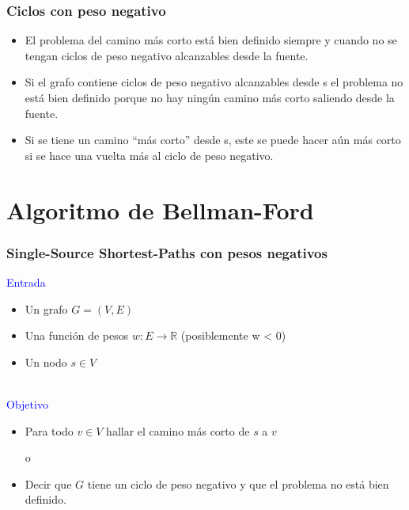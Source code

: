 \documentclass{beamer}
\begin{document}
	\begin{frame}
		\frametitle{Ciclos con peso negativo}
		\begin{itemize}
			\item El problema del camino más corto está bien definido siempre y cuando no se tengan ciclos de peso negativo alcanzables desde la fuente.
			\item Si el grafo contiene ciclos de peso negativo alcanzables desde s el problema no está bien definido porque no hay ningún camino más corto saliendo desde la fuente.
			\item Si se tiene un camino ``más corto'' desde s, este se puede hacer aún más corto si se hace una vuelta más al ciclo de peso negativo.
		\end{itemize}
	\end{frame}


\section{Algoritmo de Bellman-Ford}

	\begin{frame}
		\frametitle{Single-Source Shortest-Paths con pesos negativos}
		\textcolor{blue}{\large Entrada}\\
		\begin{itemize}
			\item Un grafo $G = (V, E)$
			\item Una función de pesos $w : E \rightarrow \mathbb{R}$ (posiblemente w < 0)
			\item Un nodo $s \in V$
		\end{itemize}
		\quad \\
		\textcolor{blue}{\large Objetivo}\\
		\begin{itemize}
			\item Para todo $v \in V$ hallar el camino más corto de $s$ a $v$ \\ 
				\begin{center} o \end{center}
			\item Decir que $G$ tiene un ciclo de peso negativo y que el problema no está bien definido.
		\end{itemize}
	\end{frame}
\end{document}
